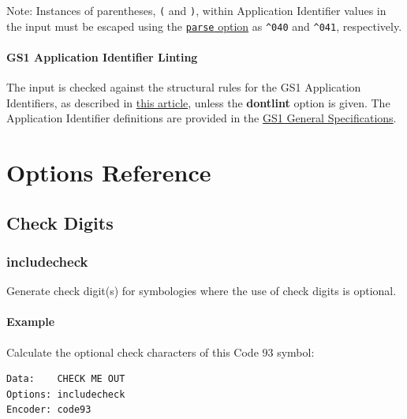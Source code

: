 Note: Instances of parentheses, \texttt{(} and \texttt{)}, within
Application Identifier values in the input must be escaped using the
\protect\hyperlink{input-processingux5cux23parse}{\texttt{parse} option}
as \texttt{\^{}040} and \texttt{\^{}041}, respectively.

\hypertarget{gs1-application-identifier-linting}{%
\paragraph{GS1 Application Identifier
Linting}\label{gs1-application-identifier-linting}}

The input is checked against the structural rules for the GS1
Application Identifiers, as described in
\href{https://www.linkedin.com/pulse/gs1-application-identifier-syntax-dictionary-terry-burton/}{this
article}, unless the \textbf{dontlint} option is given. The Application
Identifier definitions are provided in the
\href{http://www.gs1.org/barcodes-epcrfid-id-keys/gs1-general-specifications}{GS1
General Specifications}.

\hypertarget{options-reference}{%
\section{Options Reference}\label{options-reference}}

\hypertarget{check-digits}{%
\subsection{Check Digits}\label{check-digits}}

\hypertarget{includecheck}{%
\subsubsection{includecheck}\label{includecheck}}

Generate check digit(s) for symbologies where the use of check digits is
optional.

\hypertarget{example-25}{%
\paragraph{Example}\label{example-25}}

Calculate the optional check characters of this Code 93 symbol:

\begin{verbatim}
Data:    CHECK ME OUT
Options: includecheck
Encoder: code93
\end{verbatim}

